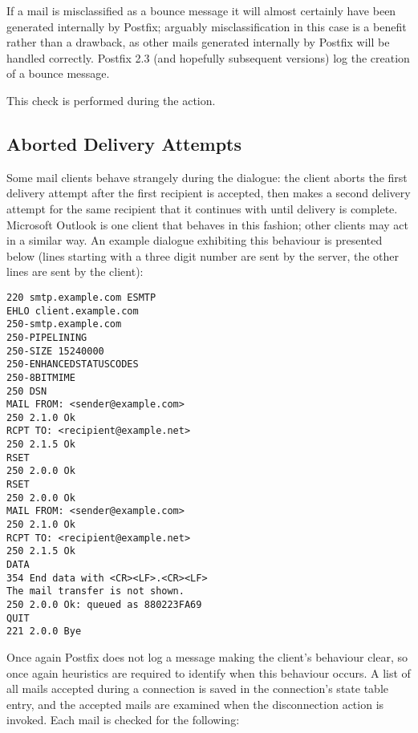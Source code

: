 If a mail is misclassified as a bounce message it will almost certainly
have been generated internally by Postfix; arguably misclassification in
this case is a benefit rather than a drawback, as other mails generated
internally by Postfix will be handled correctly.  Postfix 2.3 (and
hopefully subsequent versions) log the creation of a bounce message.

This check is performed during the  action.

\subsection{Aborted Delivery Attempts}

\label{aborted delivery attempts}

Some mail clients behave strangely during the  dialogue: the
client aborts the first delivery attempt after the first recipient is
accepted, then makes a second delivery attempt for the same recipient that
it continues with until delivery is complete.  Microsoft Outlook is one
client that behaves in this fashion; other clients may act in a similar
way.  An example dialogue exhibiting this behaviour is presented below
(lines starting with a three digit number are sent by the server, the other
lines are sent by the client):

\begin{verbatim}
220 smtp.example.com ESMTP
EHLO client.example.com
250-smtp.example.com
250-PIPELINING
250-SIZE 15240000
250-ENHANCEDSTATUSCODES
250-8BITMIME
250 DSN
MAIL FROM: <sender@example.com>
250 2.1.0 Ok
RCPT TO: <recipient@example.net>
250 2.1.5 Ok
RSET
250 2.0.0 Ok
RSET
250 2.0.0 Ok
MAIL FROM: <sender@example.com>
250 2.1.0 Ok
RCPT TO: <recipient@example.net>
250 2.1.5 Ok
DATA
354 End data with <CR><LF>.<CR><LF>
The mail transfer is not shown.
250 2.0.0 Ok: queued as 880223FA69
QUIT
221 2.0.0 Bye
\end{verbatim}

Once again Postfix does not log a message making the client's behaviour
clear, so once again heuristics are required to identify when this
behaviour occurs.  A list of all mails accepted during a connection is
saved in the connection's state table entry, and the accepted mails are
examined when the disconnection action is invoked.  Each mail is checked
for the following:

